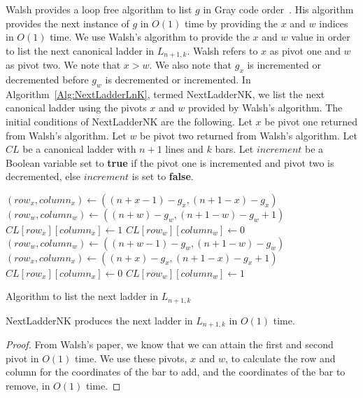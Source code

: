  Walsh provides a loop free algorithm to list $g$ in Gray code order~\cite{A41}. His algorithm provides the next 
 instance of $g$ in $O(1)$ time by providing the $x$ and $w$ indices in $O(1)$ time. We use Walsh's algorithm 
 to provide the $x$ and $w$ value in order to list the next canonical ladder in $L_{n+1, k}$. Walsh refers to $x$ as 
 pivot one and $w$ as pivot two. We note that $x>w$. We also note that $g_{x}$ is incremented or decremented 
 before $g_{w}$ is decremented or incremented. In Algorithm~\ref{Alg:NextLadderLnK}, 
 termed {\sc NextLadderNK}, we list the next canonical ladder using the pivots $x$ and $w$ provided by Walsh's algorithm. The initial conditions 
 of {\sc NextLadderNK} are the following. Let $x$ be pivot one returned from Walsh's algorithm. Let $w$ be pivot two 
 returned from Walsh's algorithm. Let $CL$ be a canonical ladder with $n+1$ lines and $k$ bars. Let $increment$ be a Boolean 
 variable set to \textbf{true} if the pivot one is incremented and pivot two is decremented, else $increment$ is set to \textbf{false}. 
\begin{algorithm}
  \begin{algorithmic}[1]
       
        \State $(row_{x}, column_{x}) \gets  ((n+x-1)-g_{x}, (n+1-x)-g_{x})$
        \State $(row_{w}, column_{w}) \gets  ((n+w)-g_{w}, (n+1-w)-g_{w}+1)$
        \State $CL[row_{x}][column_{x}] \gets 1$
        \State $CL[row_{w}][column_{w}] \gets 0$
      \Else {}
        \State $(row_{w}, column_{w}) \gets  ((n+w-1)-g_{w}, (n+1-w)-g_{w})$
        \State $(row_{x}, column_{x}) \gets  ((n+x)-g_{x}, (n+1-x)-g_{x}+1)$
        \State $CL[row_{x}][column_{x}] \gets 0$
        \State $CL[row_{w}][column_{w}] \gets 1$
      \EndIf
   \EndFunction
  \end{algorithmic}
  \caption{Algorithm to list the next ladder in $L_{n+1, k}$}
  \label{Alg:NextLadderLnK}
\end{algorithm}

\begin{corollary}
  {\sc NextLadderNK} produces the next ladder in $L_{n+1, k}$ in $O(1)$ time.
\end{corollary}
\begin{proof}
  From Walsh's paper, we know that we can attain the first and second pivot in $O(1)$ time. We use these pivots, $x$ and $w$, to calculate the 
  row and column for the coordinates of the bar to add, and the coordinates of the bar to remove, in $O(1)$ time. 
\end{proof}


